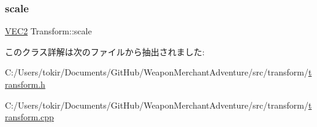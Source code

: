 \subsubsection{\texorpdfstring{scale}{scale}}
{\footnotesize\ttfamily \mbox{\hyperlink{transform_8h_afb0c5e21d4133ff4f200992c0b534e1b}{V\+E\+C2}} Transform\+::scale}



このクラス詳解は次のファイルから抽出されました\+:\begin{DoxyCompactItemize}
\item 
C\+:/\+Users/tokir/\+Documents/\+Git\+Hub/\+Weapon\+Merchant\+Adventure/src/transform/\mbox{\hyperlink{transform_8h}{transform.\+h}}\item 
C\+:/\+Users/tokir/\+Documents/\+Git\+Hub/\+Weapon\+Merchant\+Adventure/src/transform/\mbox{\hyperlink{transform_8cpp}{transform.\+cpp}}\end{DoxyCompactItemize}
